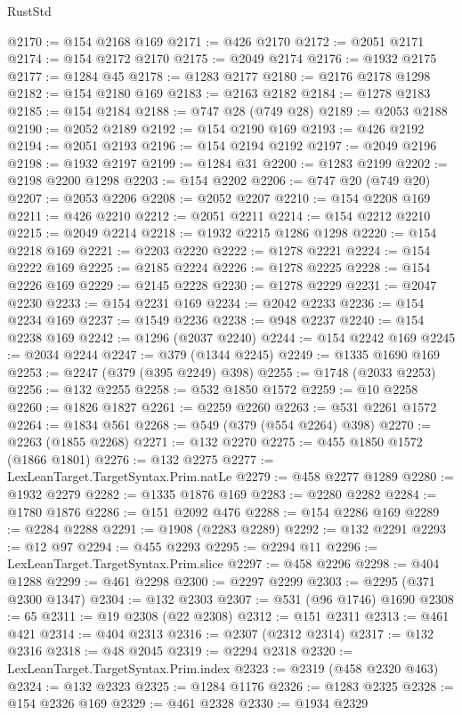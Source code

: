 \begin{lexlean}{RustStd}
\begin{coremodule}
{\begin{coremodule}
{{{{{{{{{{{{{{{{{{{{{{{{{{{{{{{{{{{{{{{{{{{{{{{{{{{{{{{{{{{{{{{{{{{{{{{{{{{{{{{{@2170 := @154 @2168 @169
@2171 := @426 @2170
@2172 := @2051 @2171
@2174 := @154 @2172 @2170
@2175 := @2049 @2174
@2176 := @1932 @2175
@2177 := @1284 @45
@2178 := @1283 @2177
@2180 := @2176 @2178 @1298
@2182 := @154 @2180 @169
@2183 := @2163 @2182
@2184 := @1278 @2183
@2185 := @154 @2184
@2188 := @747 @28 (@749 @28)
@2189 := @2053 @2188
@2190 := @2052 @2189
@2192 := @154 @2190 @169
@2193 := @426 @2192
@2194 := @2051 @2193
@2196 := @154 @2194 @2192
@2197 := @2049 @2196
@2198 := @1932 @2197
@2199 := @1284 @31
@2200 := @1283 @2199
@2202 := @2198 @2200 @1298
@2203 := @154 @2202
@2206 := @747 @20 (@749 @20)
@2207 := @2053 @2206
@2208 := @2052 @2207
@2210 := @154 @2208 @169
@2211 := @426 @2210
@2212 := @2051 @2211
@2214 := @154 @2212 @2210
@2215 := @2049 @2214
@2218 := @1932 @2215 @1286 @1298
@2220 := @154 @2218 @169
@2221 := @2203 @2220
@2222 := @1278 @2221
@2224 := @154 @2222 @169
@2225 := @2185 @2224
@2226 := @1278 @2225
@2228 := @154 @2226 @169
@2229 := @2145 @2228
@2230 := @1278 @2229
@2231 := @2047 @2230
@2233 := @154 @2231 @169
@2234 := @2042 @2233
@2236 := @154 @2234 @169
@2237 := @1549 @2236
@2238 := @948 @2237
@2240 := @154 @2238 @169
@2242 := @1296 (@2037 @2240)
@2244 := @154 @2242 @169
@2245 := @2034 @2244
@2247 := @379 (@1344 @2245)
@2249 := @1335 @1690 @169
@2253 := @2247 (@379 (@395 @2249) @398)
@2255 := @1748 (@2033 @2253)
@2256 := @132 @2255
@2258 := @532 @1850 @1572
@2259 := @10 @2258
@2260 := @1826 @1827
@2261 := @2259 @2260
@2263 := @531 @2261 @1572
@2264 := @1834 @561
@2268 := @549 (@379 (@554 @2264) @398)
@2270 := @2263 (@1855 @2268)
@2271 := @132 @2270
@2275 := @455 @1850 @1572 (@1866 @1801)
@2276 := @132 @2275
@2277 := LexLeanTarget.TargetSyntax.Prim.natLe
@2279 := @458 @2277 @1289
@2280 := @1932 @2279
@2282 := @1335 @1876 @169
@2283 := @2280 @2282
@2284 := @1780 @1876
@2286 := @151 @2092 @476
@2288 := @154 @2286 @169
@2289 := @2284 @2288
@2291 := @1908 (@2283 @2289)
@2292 := @132 @2291
@2293 := @12 @97
@2294 := @455 @2293
@2295 := @2294 @11
@2296 := LexLeanTarget.TargetSyntax.Prim.slice
@2297 := @458 @2296
@2298 := @404 @1288
@2299 := @461 @2298
@2300 := @2297 @2299
@2303 := @2295 (@371 @2300 @1347)
@2304 := @132 @2303
@2307 := @531 (@96 @1746) @1690
@2308 := 65
@2311 := @19 @2308 (@22 @2308)
@2312 := @151 @2311
@2313 := @461 @421
@2314 := @404 @2313
@2316 := @2307 (@2312 @2314)
@2317 := @132 @2316
@2318 := @48 @2045
@2319 := @2294 @2318
@2320 := LexLeanTarget.TargetSyntax.Prim.index
@2323 := @2319 (@458 @2320 @463)
@2324 := @132 @2323
@2325 := @1284 @1176
@2326 := @1283 @2325
@2328 := @154 @2326 @169
@2329 := @461 @2328
@2330 := @1934 @2329
}}}}}}}}}}}}}}}}}}}}}}}}}}}}}}}}}}}}}}}}}}}}}}}}}}}}}}}}}}}}}}}}}}}}}}}}}}}}}}}}
\end{coremodule}}
\end{coremodule}
\end{lexlean}
